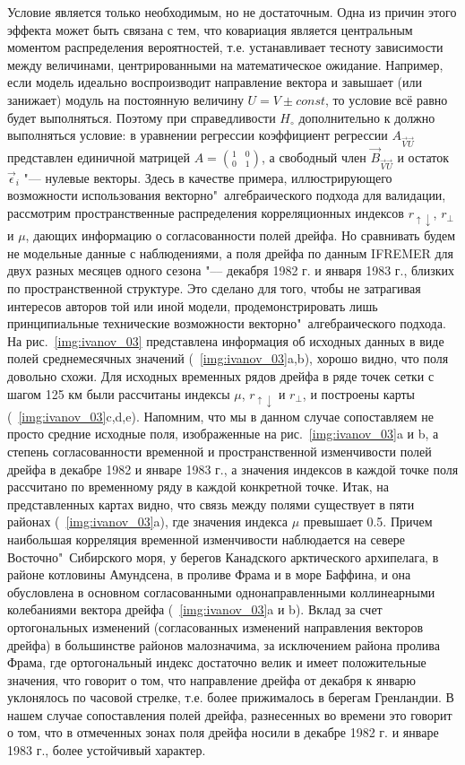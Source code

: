 {{{{{Условие  является только необходимым, но не достаточным. Одна из причин этого эффекта может быть связана с тем, что ковариация является центральным моментом распределения вероятностей, т.е. устанавливает тесноту зависимости между величинами, центрированными на математическое ожидание. Например, если модель идеально воспроизводит направление вектора  и завышает (или занижает) модуль на постоянную величину $U=V\pm{const}$, то условие  всё равно будет выполняться. Поэтому при справедливости $H_{\circ}$ дополнительно к  должно выполняться условие: в уравнении регрессии  коэффициент регрессии $A_{\vec{V}\vec{U}}$ представлен единичной матрицей $A={{1}\quad {0}\choose {0}\quad {1}}$, а свободный член $\vec{B}_{\vec{V}\vec{U}}$ и остаток $\vec{\epsilon}_{i}$ "--- нулевые векторы.
Здесь в качестве примера, иллюстрирующего возможности использования векторно"~алгебраического подхода для валидации, рассмотрим пространственные распределения корреляционных индексов $r_{\uparrow\downarrow}$, $r_{\perp}$ и $\mu$, дающих информацию о согласованности полей дрейфа. Но сравнивать будем не модельные данные с наблюдениями, а поля дрейфа по данным IFREMER для двух разных месяцев одного сезона "--– декабря 1982 г. и января 1983 г., близких по пространственной структуре. Это сделано для того, чтобы не затрагивая интересов авторов той или иной модели, продемонстрировать лишь принципиальные технические возможности векторно"~алгебраического подхода.
На рис.~\ref{img:ivanov_03} представлена информация об исходных данных в виде полей среднемесячных значений (~\ref{img:ivanov_03}a,b), хорошо видно, что поля довольно схожи. Для исходных временных рядов дрейфа в ряде точек сетки с шагом 125 км были рассчитаны индексы $\mu$, $r_{\uparrow\downarrow}$ и $r_{\perp}$, и построены карты (~\ref{img:ivanov_03}c,d,e). Напомним, что мы в данном случае сопоставляем не просто средние исходные поля, изображенные на рис.~\ref{img:ivanov_03}a и b, а степень согласованности временной и пространственной изменчивости полей дрейфа в декабре 1982 и январе 1983 г., а значения индексов в каждой точке поля рассчитано по временному ряду в каждой конкретной точке.
Итак, на представленных картах видно, что связь между полями существует в пяти районах (~\ref{img:ivanov_03}a), где значения индекса $\mu$ превышает 0.5. Причем наибольшая корреляция временной изменчивости наблюдается на севере Восточно"~Сибирского моря, у берегов Канадского арктического архипелага, в районе котловины Амундсена, в проливе Фрама и в море Баффина, и она обусловлена в основном согласованными однонаправленными коллинеарными колебаниями вектора дрейфа (~\ref{img:ivanov_03}a и b). Вклад за счет ортогональных изменений (согласованных изменений направления векторов дрейфа) в большинстве районов малозначима, за исключением района пролива Фрама, где ортогональный индекс достаточно велик и имеет положительные значения, что говорит о том, что направление дрейфа от декабря к январю уклонялось по часовой стрелке, т.е. более прижималось в берегам Гренландии. В нашем случае сопоставления полей дрейфа, разнесенных во времени это говорит о том, что в отмеченных зонах поля дрейфа носили в декабре 1982 г. и январе 1983 г., более устойчивый характер. 
}}}}}
